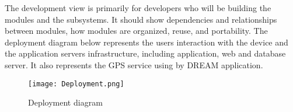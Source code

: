 \documentclass[../../main.tex]{subfiles}
\begin{document}
The development view is primarily for developers who will be building the modules and the subsystems. It should show dependencies and relationships between modules, how modules are organized, reuse, and portability. The deployment diagram below represents the users interaction with the device and the application servers infrastructure, including application, web and database server. It also represents the GPS service using by  DREAM application.

\begin{figure}[H]
    \centering
    \texttt{[image: Deployment.png]}
    \caption{
        Deployment diagram
    }
\end{figure}
\end{document}
